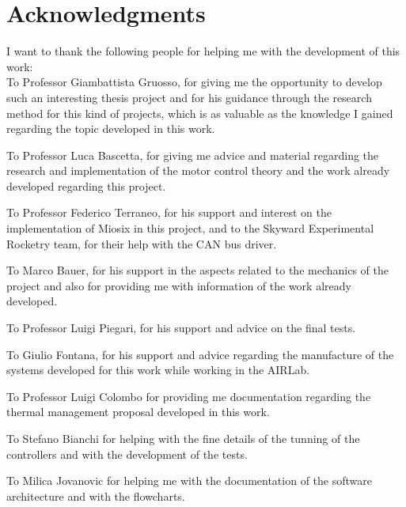 
\bigskip

\begingroup
\let\clearpage\relax
\let\cleardoublepage\relax
\let\cleardoublepage\relax
\chapter*{Acknowledgments}

I want to thank the following people for helping me with the development of this work:\\

To Professor Giambattista Gruosso, for giving me the opportunity to develop such an interesting thesis project and for his guidance through the research method for this kind of projects, which is as valuable as the knowledge I gained regarding the topic developed in this work.

To Professor Luca Bascetta, for giving me advice and material regarding the research and implementation of the motor control theory and the work already developed regarding this project.

To Professor Federico Terraneo, for his support and interest on the implementation of Miosix in this project, and to the Skyward Experimental Rocketry team, for their help with the CAN bus driver.

To Marco Bauer, for his support in the aspects related to the mechanics of the project and also for providing me with information of the work already developed.

To Professor Luigi Piegari, for his support and advice on the final tests.

To Giulio Fontana, for his support and advice regarding the manufacture of the systems developed for this work while working in the AIRLab.

To Professor Luigi Colombo for providing me documentation regarding the thermal management proposal developed in this work.

To Stefano Bianchi for helping with the fine details of the tunning of the controllers and with the development of the tests.

To Milica Jovanovic for helping me with the documentation of the software architecture and with the flowcharts.\\


\endgroup
